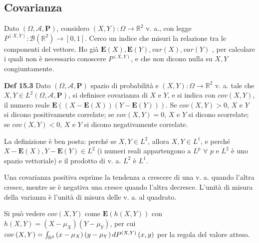 \documentclass{article}
\begin{document}
\subsection{Covarianza}

Dato $\left( \Omega ,\mathcal{A},\mathbf{P}\right) $, considero $\left(
X,Y\right) :\Omega \rightarrow 
\mathbb{R}
^{2}$ v. a., con legge $P^{\left( X,Y\right) }:\mathcal{B}\left( 
\mathbb{R}
^{2}\right) \rightarrow \left[ 0,1\right] $. Cerco un indice che misuri la
relazione tra le componenti del vettore. Ho gi\`{a} $\mathbf{E}\left(
X\right) ,\mathbf{E}\left( Y\right) ,var\left( X\right) ,var\left( Y\right) $%
, per calcolare i quali non \`{e} necessario conoscere $P^{\left( X,Y\right)
}$, e che non dicono nulla su $X,Y$ congiuntamente.

\textbf{Def 15.3} Dato $\left( \Omega ,\mathcal{A},\mathbf{P}\right) $
spazio di probabilit\`{a} e $\left( X,Y\right) :\Omega \rightarrow 
\mathbb{R}
^{2}$ v. a. tale che $X,Y\in L^{2}\left( \Omega ,\mathcal{A},\mathbf{P}%
\right) $, si definisce covarianza di $X$ e $Y$, e si indica con $cov\left(
X,Y\right) $, il numero reale $\mathbf{E}\left( \left( X-\mathbf{E}\left(
X\right) \right) \left( Y-\mathbf{E}\left( Y\right) \right) \right) $. Se $%
cov\left( X,Y\right) >0$, $X$ e $Y$ si dicono positivamente correlate; se $%
cov\left( X,Y\right) =0$, $X$ e $Y$ si dicono scorrelate; se $cov\left(
X,Y\right) <0$, $X$ e $Y$ si dicono negativamente correlate.

La definizione \`{e} ben posta: perch\'{e} se $X,Y\in L^{2}$, allora $X,Y\in
L^{1}$, e perch\'{e} $X-\mathbf{E}\left( X\right) ,Y-\mathbf{E}\left(
Y\right) \in L^{2}$ (i numeri reali appartengono a $L^{p}$ $\forall $ $p$ e $%
L^{2}$ \`{e} uno spazio vettoriale) e il prodotto di v. a. $L^{2}$ \`{e} $%
L^{1}$.

Una covarianza positiva esprime la tendenza a crescere di una v. a. quando
l'altra cresce, mentre se \`{e} negativa una cresce quando l'altra decresce.
L'unit\`{a} di misura della varianza \`{e} l'unit\`{a} di misura delle v. a.
al quadrato.

Si pu\`{o} vedere $cov\left( X,Y\right) $ come $\mathbf{E}\left( h\left(
X,Y\right) \right) $ con $h\left( X,Y\right) =\left( X-\mu _{X}\right)
\left( Y-\mu _{Y}\right) $, per cui $cov\left( X,Y\right) =\int_{%
\mathbb{R}
^{2}}\left( x-\mu _{X}\right) \left( y-\mu _{Y}\right) dP^{\left( X,Y\right)
}\left( x,y\right) $ per la regola del valore atteso.
\end{document}
